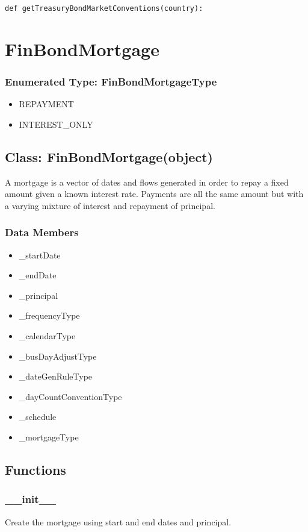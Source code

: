 \documentclass[twoside,11pt]{book}
\begin{document}
\begin{lstlisting}
def getTreasuryBondMarketConventions(country):
\end{lstlisting}

\newpage
\section{FinBondMortgage}

\subsubsection{Enumerated Type: FinBondMortgageType}
\begin{itemize}
\item{REPAYMENT}
\item{INTEREST\_ONLY}
\end{itemize}

\subsection*{Class: FinBondMortgage(object)}
A mortgage is a vector of dates and flows generated in order to repay a fixed amount given a known interest rate. Payments are all the same amount but with a varying mixture of interest and repayment of principal.  

\subsubsection*{Data Members}
\begin{itemize}
\item{\_startDate}
\item{\_endDate}
\item{\_principal}
\item{\_frequencyType}
\item{\_calendarType}
\item{\_busDayAdjustType}
\item{\_dateGenRuleType}
\item{\_dayCountConventionType}
\item{\_schedule}
\item{\_mortgageType}
\end{itemize}

\subsection*{Functions}

\subsubsection*{{\bf \_\_init\_\_}}
Create the mortgage using start and end dates and principal.  
\end{document}
